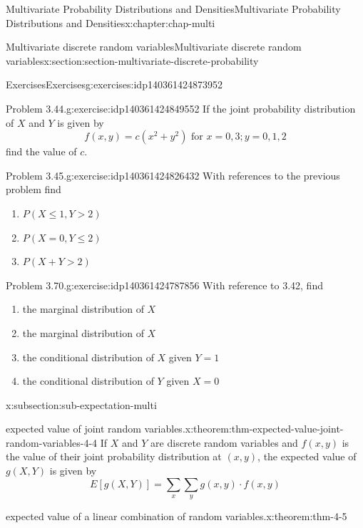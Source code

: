 \documentclass[oneside,10pt,]{book}
\numberwithin{equation}{section}
\newcommand{\gt}{>}
\begin{document}
\begin{chapterptx}{Multivariate Probability Distributions and Densities}{}{Multivariate Probability Distributions and Densities}{}{}{x:chapter:chap-multi}
\begin{sectionptx}{Multivariate discrete random variables}{}{Multivariate discrete random variables}{}{}{x:section:section-multivariate-discrete-probability}
\begin{exercises-subsection}{Exercises}{}{Exercises}{}{}{g:exercises:idp140361424873952}
\begin{divisionexercise}{2}{Problem 3.44.}{}{g:exercise:idp140361424849552}
If the joint probability distribution of \(X\) and \(Y\) is given by%
\begin{equation*}
f(x, y) = c(x^2+y^2) \text{ for } x=0, 3; y=0, 1, 2
\end{equation*}
find the value of \(c\).%
\end{divisionexercise}%
\begin{divisionexercise}{3}{Problem 3.45.}{}{g:exercise:idp140361424826432}%
With references to the previous problem find%
\begin{enumerate}[label=(\alph*)]
\item{}\(\displaystyle P(X\le 1, Y \gt 2)\)%
\item{}\(\displaystyle P(X=0, Y\le 2)\)%
\item{}\(\displaystyle P(X +Y \gt 2)\)%
\end{enumerate}
%
\end{divisionexercise}%
\begin{divisionexercise}{4}{Problem 3.70.}{}{g:exercise:idp140361424787856}%
With reference to 3.42, find%
\begin{enumerate}[label=(\alph*)]
\item{}the marginal distribution of \(X\)%
\item{}the marginal distribution of \(X\)%
\item{}the conditional distribution of \(X\) given \(Y=1\)%
\item{}the conditional distribution of \(Y\) given \(X=0\)%
\end{enumerate}
%
\end{divisionexercise}%
\end{exercises-subsection}
%
%
\typeout{************************************************}
\typeout{************************************************}
%
\begin{subsectionptx}{}{}{}{}{}{x:subsection:sub-expectation-multi}
\begin{theorem}{expected value of joint random variables.}{}{x:theorem:thm-expected-value-joint-random-variables-4-4}%
If \(X\) and \(Y\) are discrete random variables and \(\displaystyle f(x, y)\) is the value of their joint probability distribution at \(\displaystyle (x, y)\), the expected value of \(\displaystyle g(X, Y)\) is given by%
\begin{equation*}
E[g(X, Y)] = \sum_x \sum_y g(x, y)\cdot f(x,y)
\end{equation*}
%
\end{theorem}
\begin{theorem}{expected value of a linear combination of random variables.}{}{x:theorem:thm-4-5}%

\end{theorem}
\end{subsectionptx}
\end{sectionptx}
\end{chapterptx}
\end{document}

